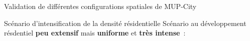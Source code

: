 \documentclass[xcolor=table]{beamer}
\begin{document}
\begin{frame}{Validation de différentes configurations spatiales de MUP-City}
{\begin{block}{Scénario d'intensification de la densité résidentielle}
	\vspace{0.4cm}
		{\footnotesize	Scénario au développement résdentiel \textbf{peu extensif} mais \textbf{uniforme} et \textbf{très intense}~:}
		\begin{block}{}
		\end{block}
	\end{block}}
\end{frame}
\end{document}
